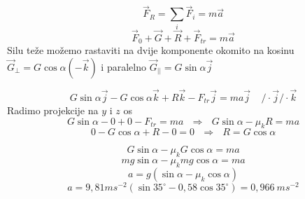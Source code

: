 

$$ \vec{F}_R=\sum_i \vec{F}_i=m\vec{a}$$
$$\vec{F}_0+\vec{G}+\vec{R}+\vec{F}_{tr}=m\vec{a} $$
Silu teže možemo rastaviti na dvije komponente okomito na kosinu 
$\vec{G}_{\bot}=G\cos\alpha(-\vec{k}) $ i paralelno $\vec{G}_{||}=G\sin\alpha\vec{j} $

$$ G\sin\alpha\vec{j}-G\cos\alpha\vec{k}+ R\vec{k}-F_{tr}\vec{j}= ma\vec{j}\ \ \ \ \  /\cdot\vec{j}/\cdot\vec{k}$$
Radimo projekcije na $y$ i $z$ os
$$ G\sin\alpha-0+0-F_{tr}=ma\ \ \ \Rightarrow\ \ \  G\sin\alpha-\mu_kR=ma  $$
$$ 0-G\cos\alpha+R-0=0\ \ \ \Rightarrow\ \ \  R=G\cos\alpha $$


$$G\sin\alpha-\mu_kG\cos\alpha=ma  $$
$$mg\sin\alpha-\mu_kmg\cos\alpha=ma  $$
$$a=g(\sin\alpha-\mu_k\cos\alpha)  $$
$$a=9,81ms^{-2}(\sin35^\circ-0,58\cos35^\circ)= 0,966\ ms^{-2} $$
